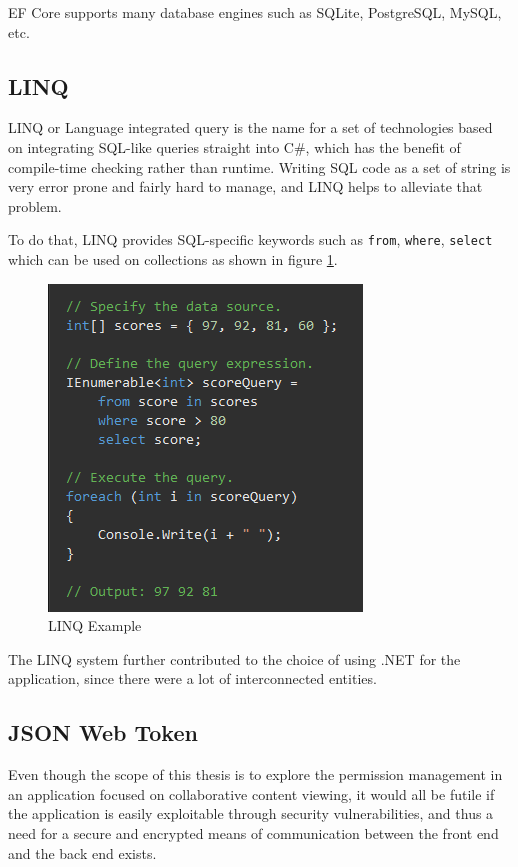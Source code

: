 EF Core supports many database engines such as SQLite, PostgreSQL, MySQL, etc.
\subsection{LINQ}
LINQ or Language integrated query is the name for a set of technologies based on integrating SQL-like queries straight into C\#, which has the benefit of compile-time checking rather than runtime. Writing SQL code as a set of string is very error prone and fairly hard to manage, and LINQ helps to alleviate that problem.

To do that, LINQ provides SQL-specific keywords such as \verb|from|, \verb|where|, \verb|select| which can be used on collections as shown in figure \ref{FigLINQExample}.

\begin{figure}[htbp]
	\centering
		\includegraphics[scale=0.85]{./figures/chapter4/linq_example.png}
	\caption{LINQ Example}
	\label{FigLINQExample}
\end{figure}

The LINQ system further contributed to the choice of using .NET for the application, since there were a lot of interconnected entities.

\subsection{JSON Web Token}
Even though the scope of this thesis is to explore the permission management in an application focused on collaborative content viewing, it would all be futile if the application is easily exploitable through security vulnerabilities, and thus a need for a secure and encrypted means of communication between the front end and the back end exists.

